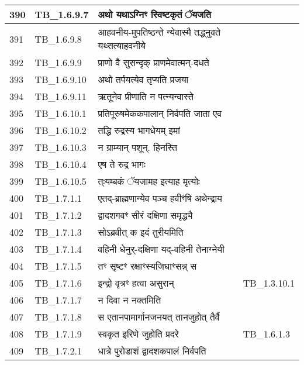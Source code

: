 \documentclass[17pt]{extarticle}
\begin{document}
\begin{longtable}{||p{0.4in}||p{0.9in}||p{4.0in}||p{0.9in}||}
        \hline
            390 & TB\_1.6.9.7 & अथो यथाऽग्निꣳ स्विष्टकृतं ॅयजति &      \\
        \hline
            391 & TB\_1.6.9.8 & आहवनीय{-}मुपतिष्ठन्ते न्येवास्मै तद्ध्नुवते यथ्सत्याहवनीये &      \\
        \hline
            392 & TB\_1.6.9.9 & प्राणो वै सुसन्दृक् प्राणमेवात्मन्{-}दधते &      \\
        \hline
            393 & TB\_1.6.9.10 & अथो तर्पयत्येव तृप्यति प्रजया &      \\
        \hline
            394 & TB\_1.6.9.11 & ऋतूनेव प्रीणाति न पत्न्यन्वास्ते &      \\
        \hline
            395 & TB\_1.6.10.1 & प्रतिपूरुषमेककपालान् निर्वपति जाता एव &      \\
        \hline
            396 & TB\_1.6.10.2 & तद्धि रुद्रस्य भागधेयम् इमां &      \\
        \hline
            397 & TB\_1.6.10.3 & न ग्राम्यान् पशून्. हिनस्ति &      \\
        \hline
            398 & TB\_1.6.10.4 & एष ते रुद्र भागः &      \\
        \hline
            399 & TB\_1.6.10.5 & त्ःयम्बकं ॅयजामह इत्याह मृत्योः &      \\
        \hline
            400 & TB\_1.7.1.1 & एतद्{-}ब्राह्मणान्येव पञ्च हवीꣳषि अथेन्द्राय &      \\
        \hline
            401 & TB\_1.7.1.2 & द्वादशगवꣳ सीरं दक्षिणा समृद्ध्यै &      \\
        \hline
            402 & TB\_1.7.1.3 & सोऽब्रवीत् क इदं तुरीयमिति &      \\
        \hline
            403 & TB\_1.7.1.4 & वहिनी धेनुर्{-}दक्षिणा यद्{-}वहिनी तेनाग्नेयी &      \\
        \hline
            404 & TB\_1.7.1.5 & तꣳ सृष्टꣳ रक्षाꣳस्यजिघाꣳसन्न् स &      \\
        \hline
            405 & TB\_1.7.1.6 & इन्द्रो वृत्रꣳ हत्वा असुरान् & TB\_1.3.10.1        \\
        \hline
            406 & TB\_1.7.1.7 & न दिवा न नक्तमिति &      \\
        \hline
            407 & TB\_1.7.1.8 & स एतानपामार्गानजनयत् तानजुहोत् तैर्वै &      \\
        \hline
            408 & TB\_1.7.1.9 & स्वकृत इरिणे जुहोति प्रदरे & TB\_1.6.1.3        \\
        \hline
            409 & TB\_1.7.2.1 & धात्रे पुरोडाशं द्वादशकपालं निर्वपति &      \\

\end{longtable}
\end{document}
